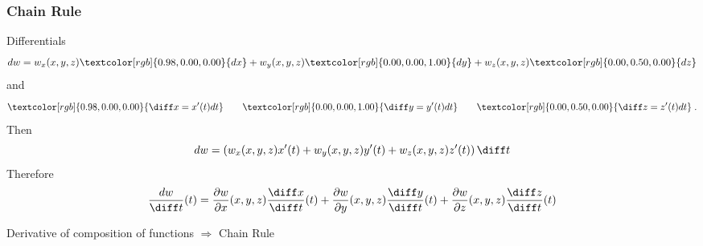 \begin{frame}
  \frametitle{Chain Rule}
Differentials
%
$$dw=w_x(x,y,z)\textcolor[rgb]{0.98,0.00,0.00}{dx} +
w_y(x,y,z)\textcolor[rgb]{0.00,0.00,1.00}{dy}+
w_z(x,y,z)\textcolor[rgb]{0.00,0.50,0.00}{dz}$$
%
and
%
$$\textcolor[rgb]{0.98,0.00,0.00}{\diff x=x'(t)dt} \qquad
\textcolor[rgb]{0.00,0.00,1.00}{\diff y = y'(t)dt} \qquad
\textcolor[rgb]{0.00,0.50,0.00}{\diff z=z'(t)dt} \; .$$
%
\pause Then
%
$$dw = \left( w_x(x,y,z) x'(t) + w_y(x,y,z) y'(t) +
w_z(x,y,z) z'(t) \right) \diff t$$
%
\pause
Therefore
%
$$\frac{dw}{\diff t}(t) = \frac{\partial w}{\partial x}(x,y,z) \frac{\diff x}{\diff t}(t) +
\frac{\partial w}{\partial y}(x,y,z) \frac{\diff y}{\diff t}(t) +
\frac{\partial w}{\partial z}(x,y,z) \frac{\diff z}{\diff t}(t)$$

\pause
Derivative of composition of functions $\Longrightarrow$ \alert<1->{Chain Rule}
\end{frame}